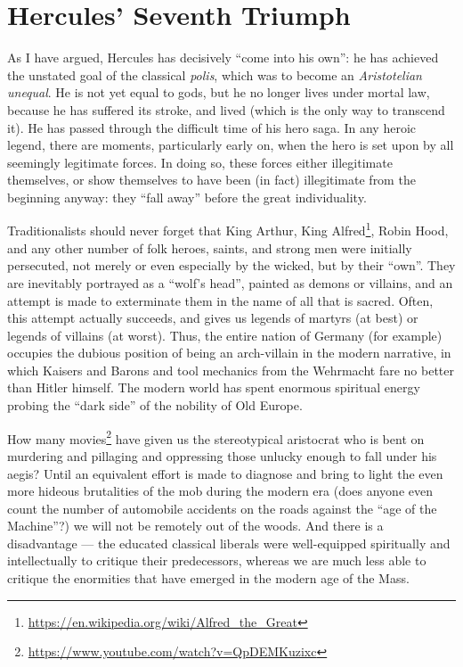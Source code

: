 \section{Hercules’ Seventh Triumph}

As I have argued, Hercules has decisively ``come into his own'': he has achieved the unstated goal of the classical \emph{polis}, which was to become an \emph{Aristotelian unequal}. He is not yet equal to gods, but he no longer lives under mortal law, because he has suffered its stroke, and lived (which is the only way to transcend it). He has passed through the difficult time of his hero saga. In any heroic legend, there are moments, particularly early on, when the hero is set upon by all seemingly legitimate forces. In doing so, these forces either illegitimate themselves, or show themselves to have been (in fact) illegitimate from the beginning anyway: they ``fall away'' before the great individuality.

Traditionalists should never forget that King Arthur, King Alfred\footnote{\url{https://en.wikipedia.org/wiki/Alfred\_the\_Great}}, Robin Hood, and any other number of folk heroes, saints, and strong men were initially persecuted, not merely or even especially by the wicked, but by their ``own''. They are inevitably portrayed as a ``wolf's head'', painted as demons or villains, and an attempt is made to exterminate them in the name of all that is sacred. Often, this attempt actually succeeds, and gives us legends of martyrs (at best) or legends of villains (at worst). Thus, the entire nation of Germany (for example) occupies the dubious position of being an arch-villain in the modern narrative, in which Kaisers and Barons and tool mechanics from the Wehrmacht fare no better than Hitler himself. The modern world has spent enormous spiritual energy probing the ``dark side'' of the nobility of Old Europe.

How many movies\footnote{\url{https://www.youtube.com/watch?v=QpDEMKuzixc}} have given us the stereotypical aristocrat who is bent on murdering and pillaging and oppressing those unlucky enough to fall under his aegis? Until an equivalent effort is made to diagnose and bring to light the even more hideous brutalities of the mob during the modern era (does anyone even count the number of automobile accidents on the roads against the ``age of the Machine''?) we will not be remotely out of the woods. And there is a disadvantage --- the educated classical liberals were well-equipped spiritually and intellectually to critique their predecessors, whereas we are much less able to critique the enormities that have emerged in the modern age of the Mass.

